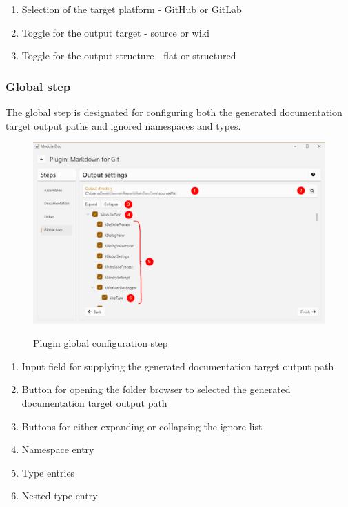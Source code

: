 \begin{enumerate}
    \item Selection of the target platform - GitHub or GitLab
    \item Toggle for the output target - source or wiki
    \item Toggle for the output structure - flat or structured
\end{enumerate}

\pagebreak
\subsubsection{Global step}

The global step is designated for configuring both the generated documentation target output paths and ignored namespaces and types.

\begin{figure}[H]
    \includegraphics[width=\linewidth]{img/modularDocGlobalSettings.png}
    \label{fig:modularGlobal}
    \caption{Plugin global configuration step}
\end{figure}

\begin{enumerate}
    \item Input field for supplying the generated documentation target output path
    \item Button for opening the folder browser to selected the generated documentation target output path
    \item Buttons for either expanding or collapsing the ignore list
    \item Namespace entry
    \item Type entries
    \item Nested type entry
\end{enumerate}

